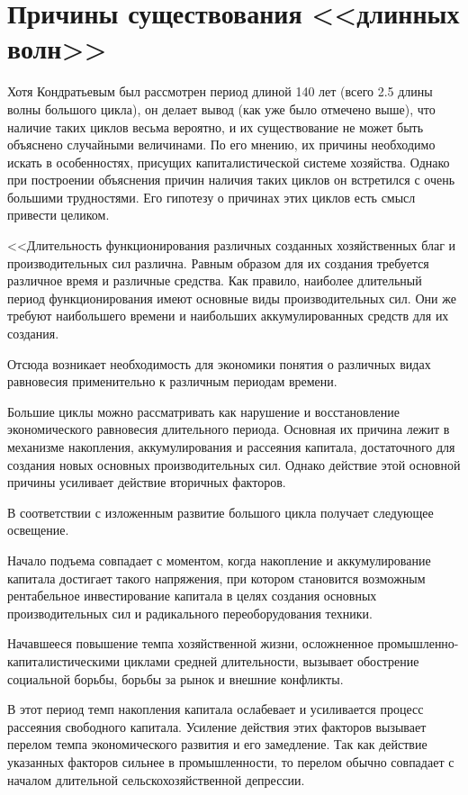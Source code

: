 \documentclass[a4paper,14pt]{extarticle}
\begin{document}
 	\section{Причины существования <<длинных волн>>}
 	
 	Хотя Кондратьевым был рассмотрен период длиной 140 лет (всего 2.5 длины волны большого цикла), он делает вывод (как уже было отмечено выше), что наличие таких циклов весьма вероятно, и их существование не может быть объяснено случайными величинами. По его мнению, их причины необходимо искать в особенностях, присущих капиталистической системе хозяйства. Однако при построении объяснения причин наличия таких циклов он встретился с очень большими трудностями. Его гипотезу о причинах этих циклов есть смысл привести целиком\cite{first}.
 	
 	<<Длительность функционирования различных созданных хозяйственных благ и производительных сил различна. Равным образом для их создания требуется различное время и различные средства. Как правило, наиболее длительный период функционирования имеют основные виды производительных сил. Они же требуют наибольшего времени и наибольших аккумулированных средств для их создания.
 	
 	Отсюда возникает необходимость для экономики понятия о различных видах равновесия применительно к различным периодам времени.
 	
 	Большие циклы можно рассматривать как нарушение и восстановление экономического равновесия длительного периода. Основная их причина лежит в механизме накопления, аккумулирования и рассеяния капитала, достаточного для создания новых основных производительных сил. Однако действие этой основной причины усиливает действие вторичных факторов.
 	
 	В соответствии с изложенным развитие большого цикла получает следующее освещение.
 	
 	Начало подъема совпадает с моментом, когда накопление и аккумулирование капитала достигает такого напряжения, при котором становится возможным рентабельное инвестирование капитала в целях создания основных производительных сил и радикального переоборудования техники.
 	
 	Начавшееся повышение темпа хозяйственной жизни, осложненное промышленно-капиталистическими циклами средней длительности, вызывает обострение социальной борьбы, борьбы за рынок и внешние конфликты.
 	
 	В этот период темп накопления капитала ослабевает и усиливается процесс рассеяния свободного капитала. Усиление действия этих факторов вызывает перелом темпа экономического развития и его замедление. Так как действие указанных факторов сильнее в промышленности, то перелом обычно совпадает с началом длительной сельскохозяйственной депрессии.
 	
\end{document}
